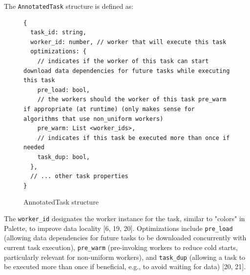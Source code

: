 \documentclass[conference]{IEEEtran}
\begin{document}
The \texttt{AnnotatedTask} structure is defined as:
\begin{figure}[h]
\centering
\begin{lstlisting}[basicstyle=\ttfamily\footnotesize, columns=fullflexible, breaklines=true]
{
  task_id: string,
  worker_id: number, // worker that will execute this task
  optimizations: {
    // indicates if the worker of this task can start download data dependencies for future tasks while executing this task
    pre_load: bool,
    // the workers should the worker of this task pre_warm if appropriate (at runtime) (only makes sense for algorithms that use non_uniform workers)
    pre_warm: List <worker_ids>,
    // indicates if this task be executed more than once if needed
    task_dup: bool,
  },
  // ... other task properties
}
\end{lstlisting}
\caption{AnnotatedTask structure}
\label{lst:annotated_task}
\end{figure}

The \texttt{worker\_id} designates the worker instance for the task, similar to "colors" in Palette, to improve data locality [6, 19, 20]. Optimizations include \texttt{pre\_load} (allowing data dependencies for future tasks to be downloaded concurrently with current task execution), \texttt{pre\_warm} (pre-invoking workers to reduce cold starts, particularly relevant for non-uniform workers), and \texttt{task\_dup} (allowing a task to be executed more than once if beneficial, e.g., to avoid waiting for data) [20, 21].
\end{document}
